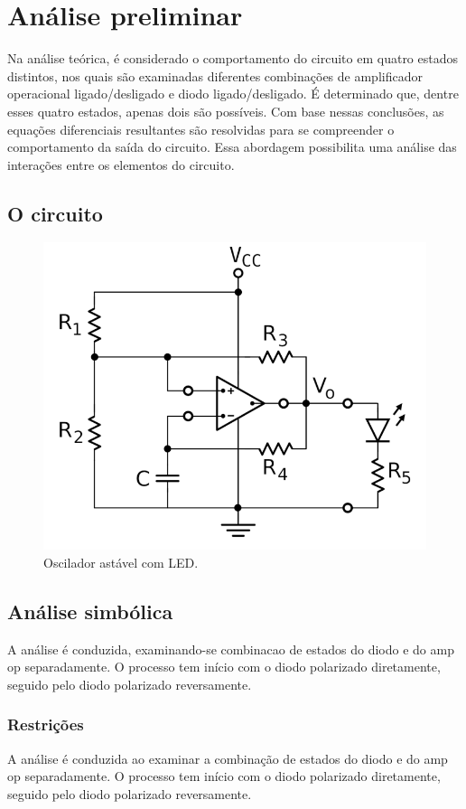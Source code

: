 \section{Análise preliminar}

Na análise teórica, é considerado o comportamento do circuito em quatro estados distintos, nos quais são examinadas diferentes combinações de amplificador operacional ligado/desligado e diodo ligado/desligado. É determinado que, dentre esses quatro estados, apenas dois são possíveis. Com base nessas conclusões, as equações diferenciais resultantes são resolvidas para se compreender o comportamento da saída do circuito. Essa abordagem possibilita uma análise das interações entre os elementos do circuito.


\subsection{O circuito}

\begin{figure}[h]
    \centering
    \includegraphics[width=0.5\columnwidth]{images/o_circuito.png}
    \caption{Oscilador astável com LED.}
\end{figure}

\newpage
\subsection{Análise simbólica}

A análise é conduzida, examinando-se combinacao de estados do diodo e do amp op separadamente. O processo tem início com o diodo polarizado diretamente, seguido pelo diodo polarizado reversamente.

\subsubsection{Restrições}

A análise é conduzida ao examinar a combinação de estados do diodo e do amp op separadamente. O processo tem início com o diodo polarizado diretamente, seguido pelo diodo polarizado reversamente.

